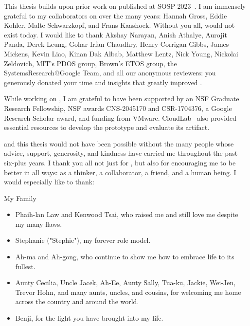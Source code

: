 %
This thesis builds upon prior work on \sys published at SOSP 2023~\cite{edna}.
I am immensely grateful to my collaborators on \sys over the many years: Hannah
Gross, Eddie Kohler, Malte Schwarzkopf, and Frans Kaashoek. Without you all,
\sys would not exist today.
%
I would like to thank Akshay Narayan, Anish Athalye, Aurojit Panda, Derek
Leung, Gohar Irfan Chaudhry, Henry Corrigan-Gibbs, James Mickens, Kevin Liao,
Kinan Dak Albab, Matthew Lentz, Nick Young, Nickolai Zeldovich, MIT's PDOS
group, Brown's ETOS group, the SystemsResearch@Google Team, and all our
anonymous reviewers: you generously donated your time and insights that greatly
improved \sys. 
%

%
While working on \sys, I am grateful to have been supported by an NSF Graduate
Research Fellowship, NSF awards CNS-2045170 and CSR-1704376, a Google Research
Scholar award, and funding from VMware.
%
CloudLab~\cite{cloudlab} also provided essential resources
to develop the \sys prototype and evaluate its artifact.
%

%
\sys and this thesis would not have been possible without the many people whose
advice, support, generosity, and kindness have carried me throughout the past
six-plus years.
%
I thank you all not just for \sys, but also for encouraging me to be better in
all ways: as a thinker, a collaborator, a friend, and a human being.
%
I would especially like to thank:

\begin{center}{My Family}\end{center}
    
    \begin{itemize}
    \item Phaih-lan Law and Kenwood Tsai, who raised me and still love me despite my many flaws. 
    
    \item Stephanie ("Stephie"), my forever role model. 
     
     \item Ah-ma and Ah-gong, who continue to show me how to embrace life to its fullest. 
        
    \item Aunty Cecilia, Uncle Jacek, Ah-Ee, Aunty
    Sally, Tua-ku, Jackie, Wei-Jen, Trevor Hohn, and many aunts, uncles, and
            cousins, for welcoming me home across the country and around the world.

    \item Benji, for the light you have brought into my life.
    \end{itemize}

